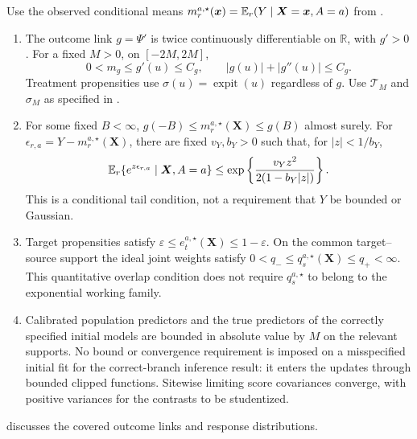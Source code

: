 \documentclass[12pt]{article}
\begin{document}
\begin{assumption}\label{asmp:pairwise_overlap}
Use the observed conditional means $m_r^{a,\star}(\boldsymbol x)=\mathbb{E}_r(Y\mid\boldsymbol X=\boldsymbol x,A=a)$ from .
\begin{enumerate}[label=(\alph*),leftmargin=*]
\item The outcome link $g=\Psi'$ is twice continuously differentiable on $\mathbb R$, with $g'>0$. For a fixed $M>0$, on $[-2M,2M]$,
\[
0<m_g\le g'(u)\le C_g,
\qquad |g(u)|+|g''(u)|\le C_g.
\]
Treatment propensities use $\sigma(u)=\operatorname{expit}(u)$ regardless of $g$. Use $\mathcal T_M$ and $\sigma_M$ as specified in .
\item For some fixed $B<\infty$, $g(-B)\le m_r^{a,\star}(\boldsymbol X)\le g(B)$ almost surely. For $\epsilon_{r,a}=Y-m_r^{a,\star}(\boldsymbol X)$, there are fixed $v_Y,b_Y>0$ such that, for $|z|<1/b_Y$,
\begin{equation}\label{eq:conditional_bernstein}
\mathbb{E}_r\{e^{z\epsilon_{r,a}}\mid\boldsymbol X,A=a\}
\le\exp\left\{\frac{v_Yz^2}{2(1-b_Y|z|)}\right\}.
\end{equation}
This is a conditional tail condition, not a requirement that $Y$ be bounded or Gaussian.
\item Target propensities satisfy $\varepsilon\le e_t^{a,\star}(\boldsymbol X)\le1-\varepsilon$. On the common target--source support the ideal joint weights satisfy $0<q_-\le q_s^{a,\star}(\boldsymbol X)\le q_+<\infty$. This quantitative overlap condition does not require $q_s^{a,\star}$ to belong to the exponential working family.
\item Calibrated population predictors and the true predictors of the correctly specified initial models are bounded in absolute value by $M$ on the relevant supports. No bound or convergence requirement is imposed on a misspecified initial fit for the correct-branch inference result: it enters the updates through bounded clipped functions. Sitewise limiting score covariances converge, with positive variances for the contrasts to be studentized.
\end{enumerate}
\end{assumption}

 discusses the covered outcome links and response distributions.
\end{document}
